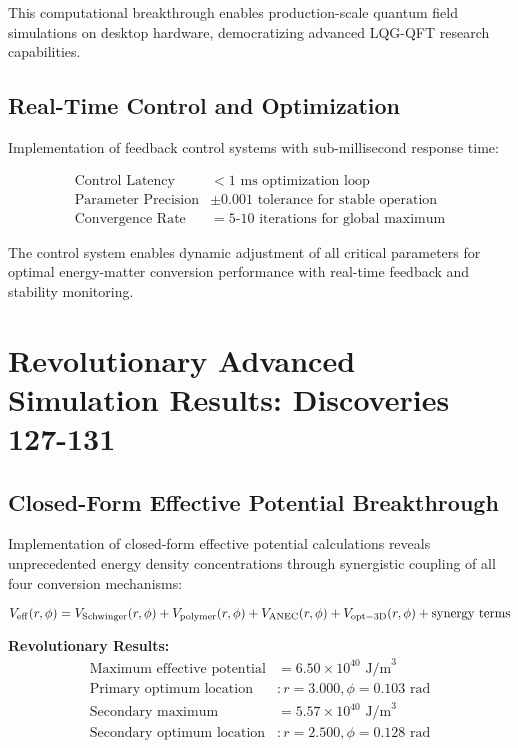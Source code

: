 \documentclass[11pt]{article}
\begin{document}
This computational breakthrough enables production-scale quantum field simulations on desktop hardware, democratizing advanced LQG-QFT research capabilities.

\subsection{Real-Time Control and Optimization}
Implementation of feedback control systems with sub-millisecond response time:

\begin{align}
\text{Control Latency} &< 1 \text{ ms optimization loop} \\
\text{Parameter Precision} &\pm 0.001 \text{ tolerance for stable operation} \\
\text{Convergence Rate} &= 5\text{-}10 \text{ iterations for global maximum}
\end{align}

The control system enables dynamic adjustment of all critical parameters for optimal energy-matter conversion performance with real-time feedback and stability monitoring.

\section{Revolutionary Advanced Simulation Results: Discoveries 127-131}

\subsection{Closed-Form Effective Potential Breakthrough}
Implementation of closed-form effective potential calculations reveals unprecedented energy density concentrations through synergistic coupling of all four conversion mechanisms:

\begin{equation}
V_{\rm eff}(r,\phi) = V_{\rm Schwinger}(r,\phi) + V_{\rm polymer}(r,\phi) + V_{\rm ANEC}(r,\phi) + V_{\rm opt-3D}(r,\phi) + \text{synergy terms}
\end{equation}

\textbf{Revolutionary Results:}
\begin{align}
\text{Maximum effective potential} &= 6.50 \times 10^{40} \text{ J/m}^3 \\
\text{Primary optimum location} &: r = 3.000, \phi = 0.103 \text{ rad} \\
\text{Secondary maximum} &= 5.57 \times 10^{40} \text{ J/m}^3 \\
\text{Secondary optimum location} &: r = 2.500, \phi = 0.128 \text{ rad}
\end{align}
\end{document}
